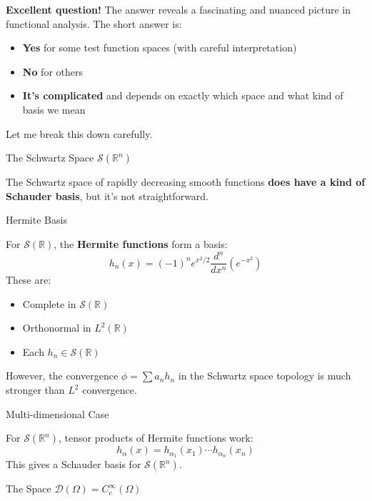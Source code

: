 \documentclass[aps,preprint]{revtex4}
\newenvironment{answer}
  {\begin{tcolorbox}[colback=green!5!white,colframe=green!75!black,title=Answer]}
  {\end{tcolorbox}}
\begin{document}
\begin{answer}
\textbf{Excellent question!} The answer reveals a fascinating and nuanced
picture in functional analysis. The short answer is:

\begin{itemize}
\item \textbf{Yes} for some test function spaces (with careful
interpretation)

\item \textbf{No} for others

\item \textbf{It's complicated} and depends on exactly which space and what
kind of basis we mean
\end{itemize}

Let me break this down carefully.

The Schwartz Space $\mathcal{S}(\mathbb{R}^n)$

The Schwartz space of rapidly decreasing smooth functions \textbf{does have
a kind of Schauder basis}, but it's not straightforward.

Hermite Basis

For $\mathcal{S}(\mathbb{R})$, the \textbf{Hermite functions} form a basis: 
\begin{equation*}
h_n(x) = (-1)^n e^{x^2/2} \frac{d^n}{dx^n}(e^{-x^2})
\end{equation*}
These are:

\begin{itemize}
\item Complete in $\mathcal{S}(\mathbb{R})$

\item Orthonormal in $L^2(\mathbb{R})$

\item Each $h_n \in \mathcal{S}(\mathbb{R})$
\end{itemize}

However, the convergence $\phi = \sum a_n h_n$ in the Schwartz space
topology is much stronger than $L^2$ convergence.

Multi-dimensional Case

For $\mathcal{S}(\mathbb{R}^n)$, tensor products of Hermite functions work: 
\begin{equation*}
h_{\alpha}(x) = h_{\alpha_1}(x_1) \cdots h_{\alpha_n}(x_n)
\end{equation*}
This gives a Schauder basis for $\mathcal{S}(\mathbb{R}^n)$.

The Space $\mathcal{D}(\Omega) = C_c^\infty(\Omega)$


\end{answer}
\end{document}
